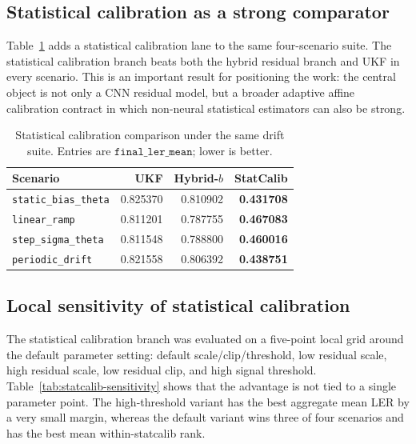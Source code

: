 \documentclass[11pt]{article}
\begin{document}
\subsection{Statistical calibration as a strong comparator}

Table~\ref{tab:statcalib-extension} adds a statistical calibration lane to the
same four-scenario suite.  The statistical calibration branch beats both the
hybrid residual branch and UKF in every scenario.  This is an important result
for positioning the work: the central object is not only a CNN residual model,
but a broader adaptive affine calibration contract in which non-neural
statistical estimators can also be strong.

\begin{table}[ht]
\centering
\small
\begin{tabular}{lrrr}
\toprule
Scenario & UKF & Hybrid-\(b\) & StatCalib \\
\midrule
\texttt{static\_bias\_theta} & 0.825370 & 0.810902 & \textbf{0.431708} \\
\texttt{linear\_ramp} & 0.811201 & 0.787755 & \textbf{0.467083} \\
\texttt{step\_sigma\_theta} & 0.811548 & 0.788800 & \textbf{0.460016} \\
\texttt{periodic\_drift} & 0.821558 & 0.806392 & \textbf{0.438751} \\
\bottomrule
\end{tabular}
\caption{Statistical calibration comparison under the same drift
suite.  Entries are \(\texttt{final\_ler\_mean}\); lower is better.}
\label{tab:statcalib-extension}
\end{table}

\subsection{Local sensitivity of statistical calibration}

The statistical calibration branch was evaluated on a five-point local grid
around the default parameter setting: default scale/clip/threshold, low
residual scale, high residual scale, low residual clip, and high signal
threshold.  Table~\ref{tab:statcalib-sensitivity} shows that the advantage is
not tied to a single parameter point.  The high-threshold variant has the best
aggregate mean LER by a very small margin, whereas the default variant wins
three of four scenarios and has the best mean within-statcalib rank.
\end{document}
